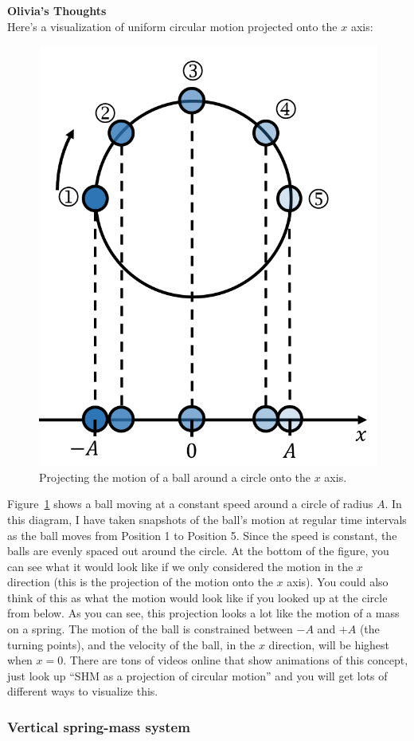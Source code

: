 \begin{framed}
\textbf{Olivia's Thoughts}\\
Here's a visualization of uniform circular motion projected onto the $x$ axis:

\begin{figure}[!htbp]
\centering
\includegraphics[width=0.4\linewidth]{files/circularmotionprojec-955ca62bb4a2c11eeccce046ef38be60.png}
\caption[]{Projecting the motion of a ball around a circle onto the $x$ axis.}
\label{fig:simpleharmonicmotion:projection}
\end{figure}

Figure~\ref{fig:simpleharmonicmotion:projection} shows a ball moving at a constant speed around a circle of radius $A$. In this diagram, I have taken snapshots of the ball's motion at regular time intervals as the ball moves from Position 1 to Position 5. Since the speed is constant, the balls are evenly spaced out around the circle. At the bottom of the figure, you can see what it would look like if we only considered the motion in the $x$ direction (this is the projection of the motion onto the $x$ axis). You could also think of this as what the motion would look like if you looked up at the circle from below. As you can see, this projection looks a lot like the motion of a mass on a spring. The motion of the ball is constrained between $-A$ and $+A$ (the turning points), and the velocity of the ball, in the $x$ direction, will be highest when $x=0$. There are tons of videos online that show animations of this concept, just look up ``SHM as a projection of circular motion'' and you will get lots of different ways to visualize this.
\end{framed}

\subsubsection{Vertical spring-mass system}

